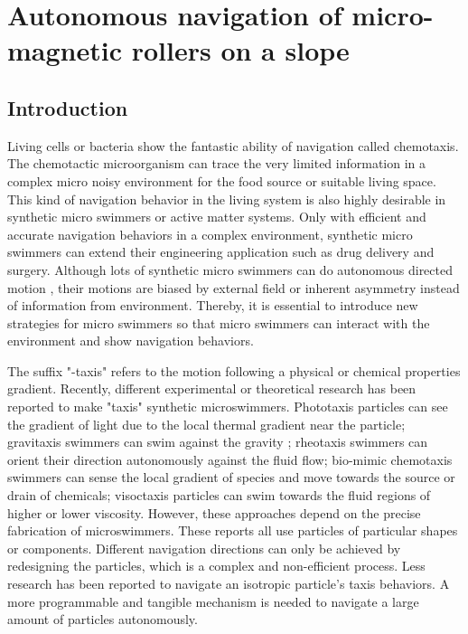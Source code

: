 \chapter{Autonomous navigation of micro-magnetic rollers on a slope} 
\section{Introduction}
Living cells or bacteria show the fantastic ability of navigation called chemotaxis.\cite{alon1999robustness,adler1975chemotaxis} The chemotactic microorganism can trace the very limited information in  a complex micro noisy environment for the food source or suitable living space.\cite{keller1971model} This kind of navigation behavior in the living system is also highly desirable in synthetic micro swimmers or active matter systems. \cite{patteson2016active} Only with efficient and accurate navigation behaviors in a complex environment, synthetic micro swimmers can extend their engineering application  such as drug delivery and surgery.\cite{de2017micromotor,xu2018sperm} Although lots of synthetic  micro swimmers can do autonomous directed motion \cite{yan2016reconfiguring,dou2016directed,lee2019directed,baker2019shape}, their motions are biased by  external field or inherent asymmetry instead of information from environment. Thereby, it is essential to introduce new strategies for micro swimmers so that micro swimmers can interact with the environment and show navigation behaviors.  

The suffix "-taxis" refers to the motion following a physical or chemical properties gradient. Recently, different experimental or theoretical research has been reported to make "taxis" synthetic microswimmers. Phototaxis particles can see the gradient of light due to the local thermal gradient near the particle\cite{yu2019phototaxis,dai2016programmable,lozano2016phototaxis,chen2017light}; gravitaxis swimmers can swim against the gravity \cite{campbell2013gravitaxis,ten2014gravitaxis}; rheotaxis swimmers can orient their direction autonomously against the fluid flow\cite{Palacci2015,ren2017rheotaxis,brosseau2019relating}; bio-mimic chemotaxis swimmers can sense the local gradient of species and move towards the source or drain of chemicals\cite{dou2019autonomous}; visoctaxis particles can swim towards the fluid regions of higher or lower viscosity\cite{liebchen2018viscotaxis}. However, these approaches depend on the precise fabrication of microswimmers.
These reports all use particles of particular shapes or components. Different navigation directions can only be achieved by redesigning the particles, which is a complex and non-efficient process. Less research has been reported to navigate an isotropic particle's taxis behaviors. A more programmable and tangible mechanism is needed to navigate a large amount of particles autonomously. \cite{dou2019autonomous}

